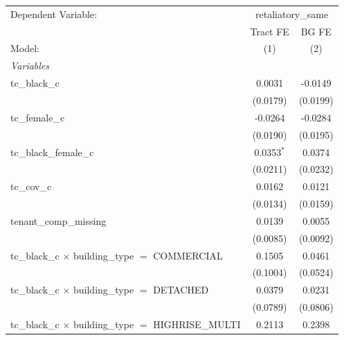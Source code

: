 \begingroup
\centering
\begin{tabular}{lcc}
   \tabularnewline \midrule \midrule
   Dependent Variable: & \multicolumn{2}{c}{retaliatory\_same}\\
                                                                       & Tract FE       & BG FE \\   
   Model:                                                              & (1)            & (2)\\  
   \midrule
   \emph{Variables}\\
   tc\_black\_c                                                        & 0.0031         & -0.0149\\   
                                                                       & (0.0179)       & (0.0199)\\   
   tc\_female\_c                                                       & -0.0264        & -0.0284\\   
                                                                       & (0.0190)       & (0.0195)\\   
   tc\_black\_female\_c                                                & 0.0353$^{*}$   & 0.0374\\   
                                                                       & (0.0211)       & (0.0232)\\   
   tc\_cov\_c                                                          & 0.0162         & 0.0121\\   
                                                                       & (0.0134)       & (0.0159)\\   
   tenant\_comp\_missing                                               & 0.0139         & 0.0055\\   
                                                                       & (0.0085)       & (0.0092)\\   
   tc\_black\_c $\times$ building\_type $=$ COMMERCIAL                 & 0.1505         & 0.0461\\   
                                                                       & (0.1004)       & (0.0524)\\   
   tc\_black\_c $\times$ building\_type $=$ DETACHED                   & 0.0379         & 0.0231\\   
                                                                       & (0.0789)       & (0.0806)\\   
   tc\_black\_c $\times$ building\_type $=$ HIGHRISE\_MULTI            & 0.2113         & 0.2398\\   

\end{tabular}
